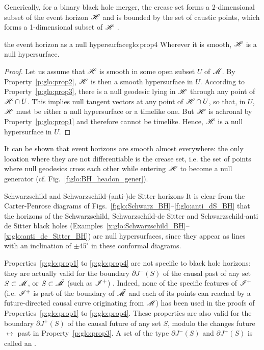 Generically, for a binary black hole merger,
the crease set forms a 2-dimensional subset of the event horizon
$\mathscr{H}$ and is bounded by the set of caustic points, which forms a 1-dimensional
subset of $\mathscr{H}$ \cite{Siino98a,Siino98b,HusaW99,CohenKS12,GadioR23}.


\begin{tprop}{the event horizon as a null hypersurface}{glo:prop4}
Wherever it is smooth, $\mathscr{H}$ is a null hypersurface.
\end{tprop}

\begin{proof}
Let us assume that $\mathscr{H}$ is smooth in some open subset $U$ of $\mathscr{M}$.
By Property~\ref{p:glo:prop2}, $\mathscr{H}$ is then a smooth hypersurface in $U$.
According to Property~\ref{p:glo:prop3}, there is a null geodesic lying in $\mathscr{H}$ through
any point of $\mathscr{H}\cap U$.
This implies null tangent vectors at any point of $\mathscr{H}\cap U$, so that, in $U$,
$\mathscr{H}$ must be either a null hypersurface or a timelike one. But $\mathscr{H}$ is achronal by Property~\ref{p:glo:prop1} and therefore cannot be timelike. Hence, $\mathscr{H}$ is a null hypersurface in $U$.
\end{proof}

It can be shown that event horizons are smooth almost everywhere: the only
location where they are not differentiable is the crease set, i.e. the set of points
where null geodesics cross each other while entering $\mathscr{H}$ to become a null
generator (cf. Fig.~\ref{f:glo:BH_headon_gener}).

\begin{texample}{Schwarzschild and Schwarzschild-(anti-)de Sitter horizons}{}
It is clear from the Carter-Penrose diagrams of Figs.~\ref{f:glo:Schwarz_BH}--\ref{f:glo:anti_dS_BH} that the horizons of the Schwarzschild, Schwarzschild-de Sitter
and Schwarzschild-anti de Sitter black holes (Examples~\ref{x:glo:Schwarzschild_BH}--\ref{x:glo:anti_de_Sitter_BH}) are null hypersurfaces, since they appear
as lines with an inclination of $\pm 45^\circ$ in these conformal diagrams.
\end{texample}


\begin{remark}
\label{r:glo:achronal_boundaries}
Properties~\ref{p:glo:prop1} to \ref{p:glo:prop4} are not specific to black hole horizons: they are actually
valid for the boundary $\partial J^-(S)$ of the causal past of any set $S\subset\mathscr{M}$,
or $S\subset\tilde{\mathscr{M}}$ (such as $\mathscr{I}^+$) \cite{Penro68,HawkiE73,Gallo04,ONeil83}. Indeed, none of the
specific features of $\mathscr{I}^+$ (i.e. $\mathscr{I}^+$ is part of the boundary of $\tilde{\mathscr{M}}$ and
each of its points can reached by a future-directed causal curve originating from $\mathscr{M}$)
has been used in the proofs of
Properties~\ref{p:glo:prop1} to \ref{p:glo:prop4}.
These properties are also valid for the boundary $\partial J^+(S)$ of the causal future of any
set $S$, modulo the changes future $\leftrightarrow$ past in Property~\ref{p:glo:prop3}.
A set of the type $\partial J^-(S)$ and $\partial J^+(S)$ is called an
\cite{HawkiE73}.
\end{remark}



